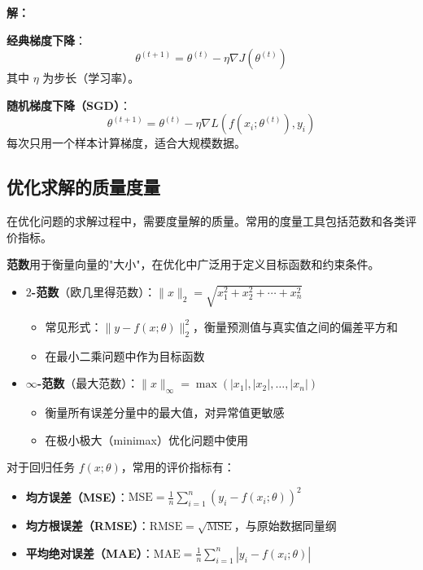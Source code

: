 \begin{example}[神经网络的梯度下降]
\textbf{解：}

\textbf{经典梯度下降}：
\[
\theta^{(t+1)} = \theta^{(t)} - \eta \nabla J(\theta^{(t)})
\]
其中 $\eta$ 为步长（学习率）。

\textbf{随机梯度下降（SGD）}：
\[
\theta^{(t+1)} = \theta^{(t)} - \eta \nabla L(f(x_i; \theta^{(t)}), y_i)
\]
每次只用一个样本计算梯度，适合大规模数据。
\end{example}

\subsection{优化求解的质量度量}

在优化问题的求解过程中，需要度量解的质量。常用的度量工具包括范数和各类评价指标。

\begin{conceptbox}[优化中的范数]
\textbf{范数}用于衡量向量的"大小"，在优化中广泛用于定义目标函数和约束条件。

\begin{itemize}[itemsep=0.3em]
    \item \textbf{$2$-范数}（欧几里得范数）：$\|x\|_2 = \sqrt{x_1^2 + x_2^2 + \cdots + x_n^2}$
    \begin{itemize}
        \item 常见形式：$\|y - f(x; \theta)\|_2^2$，衡量预测值与真实值之间的偏差平方和
        \item 在最小二乘问题中作为目标函数
    \end{itemize}
    \item \textbf{$\infty$-范数}（最大范数）：$\|x\|_\infty = \max(|x_1|, |x_2|, \ldots, |x_n|)$
    \begin{itemize}
        \item 衡量所有误差分量中的最大值，对异常值更敏感
        \item 在极小极大（minimax）优化问题中使用
    \end{itemize}
\end{itemize}
\end{conceptbox}

\begin{conceptbox}[回归问题的评价指标]
对于回归任务 $f(x; \theta)$，常用的评价指标有：
\begin{itemize}[itemsep=0.3em]
    \item \textbf{均方误差（MSE）}：$\displaystyle\text{MSE} = \frac{1}{n}\sum_{i=1}^{n}(y_i - f(x_i; \theta))^2$
    \item \textbf{均方根误差（RMSE）}：$\text{RMSE} = \sqrt{\text{MSE}}$，与原始数据同量纲
    \item \textbf{平均绝对误差（MAE）}：$\displaystyle\text{MAE} = \frac{1}{n}\sum_{i=1}^{n}|y_i - f(x_i; \theta)|$
\end{itemize}
\end{conceptbox}

